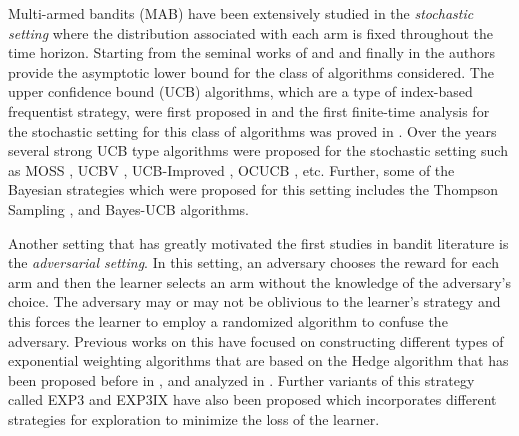 Multi-armed bandits (MAB) have been extensively studied in the \textit{stochastic setting} where the distribution associated with each arm is fixed throughout the time horizon. Starting from the seminal works of \citet{thompson1933likelihood} and  \citet{robbins1952some} and finally in \citet{lai1985asymptotically} the authors provide the asymptotic lower bound for the class of algorithms considered.  The upper confidence bound (UCB) algorithms, which are a type of index-based frequentist strategy, were first proposed in \citet{agrawal1995sample} and the first finite-time analysis for the stochastic setting for this class of algorithms was proved in \citet{auer2002finite}. Over the years several strong UCB type algorithms were proposed for the stochastic setting such as MOSS \citep{audibert2009minimax}, UCBV \citep{audibert2009exploration}, UCB-Improved \citep{auer2010ucb}, OCUCB \citep{lattimore2015optimally}, etc. Further, some of the Bayesian strategies which were proposed for this setting includes the Thompson Sampling \citep{agrawal2012analysis},\citep{agrawal2013further} and Bayes-UCB \citep{kaufmann2012bayesian} algorithms.

Another setting that has greatly motivated the first studies in bandit literature is the \textit{adversarial setting}. In this setting, an adversary chooses the reward for each arm and then the learner selects an arm without the knowledge of the adversary's choice. The adversary may or may not be oblivious to the learner's strategy and this forces the learner to employ a randomized algorithm to confuse the adversary. Previous works on this have focused on constructing different types of exponential weighting algorithms that are based on the Hedge algorithm that has been proposed before in \citet{littlestone1994weighted},\citet{freund1995desicion} and analyzed in \citet{auer1995gambling}. Further variants of this strategy called EXP3 \citep{auer2002nonstochastic} and EXP3IX \citep{kocak2014efficient} have also been proposed which incorporates different strategies for exploration to minimize the loss of the learner.

